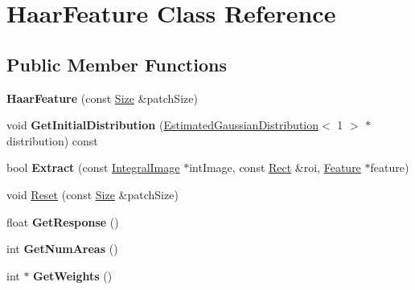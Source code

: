 \hypertarget{classHaarFeature}{}\section{Haar\+Feature Class Reference}
\label{classHaarFeature}
\subsection*{Public Member Functions}
\begin{DoxyCompactItemize}
\item 
\hypertarget{classHaarFeature_a54b1a86c01341793d393cce0e8ff7d72}{}{\bfseries Haar\+Feature} (const \hyperlink{classSize}{Size} \&patch\+Size)\label{classHaarFeature_a54b1a86c01341793d393cce0e8ff7d72}

\item 
\hypertarget{classHaarFeature_a293df81066b1cba52baac9904e155b20}{}void {\bfseries Get\+Initial\+Distribution} (\hyperlink{classEstimatedGaussianDistribution}{Estimated\+Gaussian\+Distribution}$<$ 1 $>$ $\ast$distribution) const \label{classHaarFeature_a293df81066b1cba52baac9904e155b20}

\item 
\hypertarget{classHaarFeature_a9b74485ba82429c7311a0aa490a2f1b6}{}bool {\bfseries Extract} (const \hyperlink{classIntegralImage}{Integral\+Image} $\ast$int\+Image, const \hyperlink{classRect}{Rect} \&roi, \hyperlink{classFeature}{Feature} $\ast$feature)\label{classHaarFeature_a9b74485ba82429c7311a0aa490a2f1b6}

\item 
void \hyperlink{classHaarFeature_a1ca66bee1bcf71feeb472b5e34ab750c}{Reset} (const \hyperlink{classSize}{Size} \&patch\+Size)
\item 
\hypertarget{classHaarFeature_a40d755bcccf0ea1e5ebb154eea7d26ac}{}float {\bfseries Get\+Response} ()\label{classHaarFeature_a40d755bcccf0ea1e5ebb154eea7d26ac}

\item 
\hypertarget{classHaarFeature_aa2abfada29f6848fef8d45c4c85479c1}{}int {\bfseries Get\+Num\+Areas} ()\label{classHaarFeature_aa2abfada29f6848fef8d45c4c85479c1}

\item 
\hypertarget{classHaarFeature_a25936c7b13e76190a58ae737de1de360}{}int $\ast$ {\bfseries Get\+Weights} ()\label{classHaarFeature_a25936c7b13e76190a58ae737de1de360}

\end{DoxyCompactItemize}


